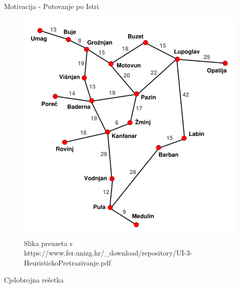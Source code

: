 \documentclass{beamer}
\begin{document}
	\begin{frame}{Motivacija - Putovanje po Istri}
		\begin{figure}
			\includegraphics[scale=0.3]{images/istra.png}
			\caption{Slika preuzeta s https://www.fer.unizg.hr/\_download/repository/UI-3-HeuristickoPretrazivanje.pdf}
		\end{figure}
	\end{frame}

  \begin{frame}{Cjelobrojna rešetka}
  	\begin{figure}[h]
  		\centering
  		\begin{tikzpicture}
  			
  		\end{tikzpicture}
  	\end{figure}
  \end{frame}
  
  
\end{document}
